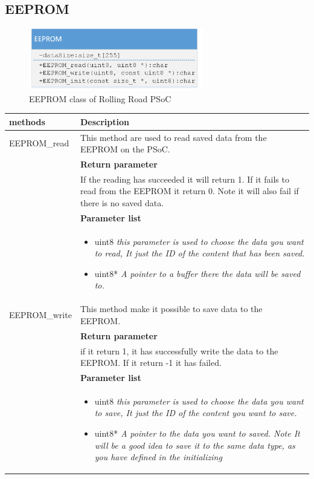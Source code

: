 \subsection{EEPROM}

\begin{figure}[H]
	\centering
	\includegraphics [width=3in]{Software/Pictures/klassediagram_EEPROM.png}
	\caption{EEPROM class of Rolling Road PSoC}
	\label{fig:Class_diagram_EEPROM_RR_PSoC}
\end{figure}


\begin{table}[H]
	\centering
	\begin{tabular}{|p{5 cm}|p{10 cm}|}
		\hline
		\textbf{methods} & \textbf{Description} \\ \hline
		
		EEPROM\_read
		& This method are used to read saved data from the EEPROM on the PSoC.
		\\ & \textbf{Return parameter}
		\\ & If the reading has succeeded it will return 1. If it fails to read from the EEPROM it return 0. Note it will also fail if there is no saved data.
		\\ & \textbf{Parameter list}
		\\ & \begin{itemize}
			\item {\large uint8}
			\subitem \textit{this parameter is used to choose the data you want to read, It just the ID of the content that has been saved.}
			\item {\large uint8*}
			\subitem \textit{A pointer to a buffer there the data will be saved to.}
		\end{itemize}
		\\ \hline
		
		EEPROM\_write
		& This method make it possible to save data to the EEPROM.
		\\ & \textbf{Return parameter}
		\\ & if it return 1, it has successfully write the data to the EEPROM. If it return -1 it has failed.
		\\ & \textbf{Parameter list}
		\\ & \begin{itemize}
			\item {\large uint8}
			\subitem \textit{this parameter is used to choose the data you want to save, It just the ID of the content you want to save.}
			\item {\large uint8*}
			\subitem \textit{A pointer to the data you want to saved. Note It will be a good idea to save it to the same data type, as you have defined in the initializing}
		\end{itemize}
		\\ \hline
		

\end{tabular}
\end{table}
